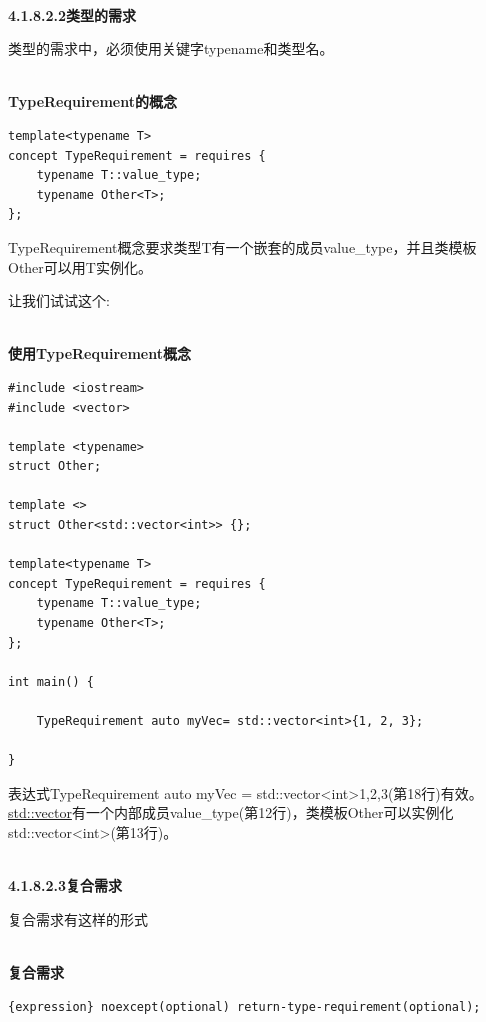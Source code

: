 \hspace*{\fill} \\ %
\noindent
\textbf{4.1.8.2.2\hspace{0.2cm}类型的需求}

类型的需求中，必须使用关键字typename和类型名。

\hspace*{\fill} \\ %
\noindent
\textbf{TypeRequirement的概念}
\begin{lstlisting}[style=styleCXX]
template<typename T>
concept TypeRequirement = requires {
	typename T::value_type;
	typename Other<T>;
};
\end{lstlisting}

TypeRequirement概念要求类型T有一个嵌套的成员value\_type，并且类模板Other可以用T实例化。

让我们试试这个:

\hspace*{\fill} \\ %
\noindent
\textbf{使用TypeRequirement概念}
\begin{lstlisting}[style=styleCXX]
#include <iostream>
#include <vector>

template <typename>
struct Other;

template <>
struct Other<std::vector<int>> {};

template<typename T>
concept TypeRequirement = requires {
	typename T::value_type;
	typename Other<T>;
};

int main() {

	TypeRequirement auto myVec= std::vector<int>{1, 2, 3};

}
\end{lstlisting}

表达式TypeRequirement auto myVec = std::vector<int>{1,2,3}(第18行)有效。\href{https://en.cppreference.com/w/cpp/container/vector}{std::vector}有一个内部成员value\_type(第12行)，类模板Other可以实例化std::vector<int>(第13行)。

\hspace*{\fill} \\ %
\noindent
\textbf{4.1.8.2.3\hspace{0.2cm}复合需求}

复合需求有这样的形式

\hspace*{\fill} \\ %
\noindent
\textbf{复合需求}
\begin{lstlisting}[style=styleCXX]
{expression} noexcept(optional) return-type-requirement(optional);
\end{lstlisting}

